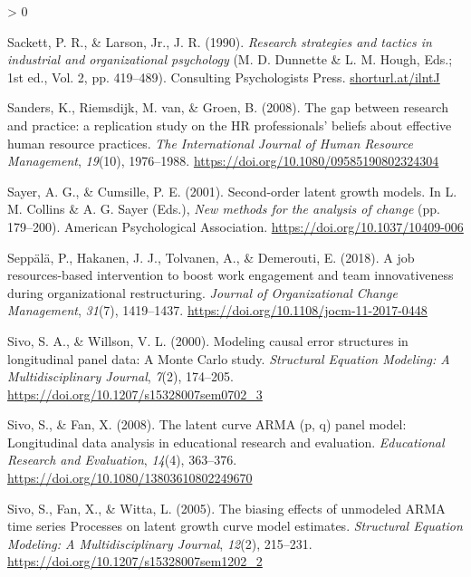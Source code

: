 \documentclass[
12pt, %
twoside,
english]{guelphthesis}
\newlength{\cslhangindent}
\newenvironment{CSLReferences}[2] %
 {%
  \setlength{\parindent}{0pt}
  \ifodd #1 \everypar{\setlength{\hangindent}{\cslhangindent}}\ignorespaces\fi
  \ifnum #2 > 0
  \setlength{\parskip}{\linespacing{2}}
  \fi
 }%
 {}
\begin{document}
\begin{CSLReferences}{1}{0}
\leavevmode{}%
Sackett, P. R., \& Larson, Jr., J. R. (1990). \emph{Research strategies and tactics in industrial and organizational psychology} (M. D. Dunnette \& L. M. Hough, Eds.; 1st ed., Vol. 2, pp. 419--489). Consulting Psychologists Press. \href{https://shorturl.at/ilntJ}{shorturl.at/ilntJ}

\leavevmode{}%
Sanders, K., Riemsdijk, M. van, \& Groen, B. (2008). The gap between research and practice: a replication study on the HR professionals' beliefs about effective human resource practices. \emph{The International Journal of Human Resource Management}, \emph{19}(10), 1976--1988. \url{https://doi.org/10.1080/09585190802324304}

\leavevmode{}%
Sayer, A. G., \& Cumsille, P. E. (2001). Second-order latent growth models. In L. M. Collins \& A. G. Sayer (Eds.), \emph{New methods for the analysis of change} (pp. 179--200). American Psychological Association. \url{https://doi.org/10.1037/10409-006}

\leavevmode{}%
Seppälä, P., Hakanen, J. J., Tolvanen, A., \& Demerouti, E. (2018). A job resources-based intervention to boost work engagement and team innovativeness during organizational restructuring. \emph{Journal of Organizational Change Management}, \emph{31}(7), 1419--1437. \url{https://doi.org/10.1108/jocm-11-2017-0448}

\leavevmode{}%
Sivo, S. A., \& Willson, V. L. (2000). Modeling causal error structures in longitudinal panel data: A Monte Carlo study. \emph{Structural Equation Modeling: A Multidisciplinary Journal}, \emph{7}(2), 174--205. \url{https://doi.org/10.1207/s15328007sem0702_3}

\leavevmode{}%
Sivo, S., \& Fan, X. (2008). The latent curve ARMA (p, q) panel model: Longitudinal data analysis in educational research and evaluation. \emph{Educational Research and Evaluation}, \emph{14}(4), 363--376. \url{https://doi.org/10.1080/13803610802249670}

\leavevmode{}%
Sivo, S., Fan, X., \& Witta, L. (2005). The biasing effects of unmodeled ARMA time series Processes on latent growth curve model estimates. \emph{Structural Equation Modeling: A Multidisciplinary Journal}, \emph{12}(2), 215--231. \url{https://doi.org/10.1207/s15328007sem1202_2}


\end{CSLReferences}
\end{document}
